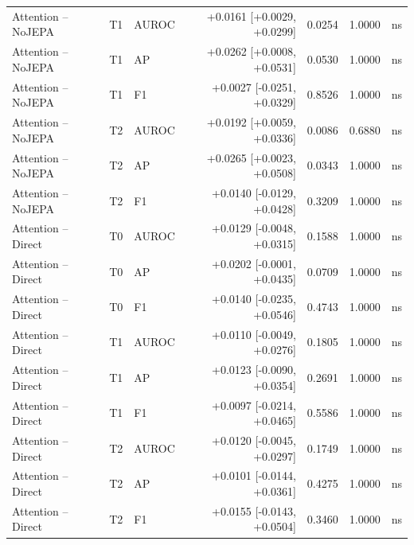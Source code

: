 \begin{table}[t]
\begin{tabular}{lllrrrc}
Attention -- NoJEPA & T1 & AUROC & +0.0161 [+0.0029, +0.0299] & 0.0254 & 1.0000 & ns \\
Attention -- NoJEPA & T1 & AP & +0.0262 [+0.0008, +0.0531] & 0.0530 & 1.0000 & ns \\
Attention -- NoJEPA & T1 & F1 & +0.0027 [-0.0251, +0.0329] & 0.8526 & 1.0000 & ns \\
Attention -- NoJEPA & T2 & AUROC & +0.0192 [+0.0059, +0.0336] & 0.0086 & 0.6880 & ns \\
Attention -- NoJEPA & T2 & AP & +0.0265 [+0.0023, +0.0508] & 0.0343 & 1.0000 & ns \\
Attention -- NoJEPA & T2 & F1 & +0.0140 [-0.0129, +0.0428] & 0.3209 & 1.0000 & ns \\
Attention -- Direct & T0 & AUROC & +0.0129 [-0.0048, +0.0315] & 0.1588 & 1.0000 & ns \\
Attention -- Direct & T0 & AP & +0.0202 [-0.0001, +0.0435] & 0.0709 & 1.0000 & ns \\
Attention -- Direct & T0 & F1 & +0.0140 [-0.0235, +0.0546] & 0.4743 & 1.0000 & ns \\
Attention -- Direct & T1 & AUROC & +0.0110 [-0.0049, +0.0276] & 0.1805 & 1.0000 & ns \\
Attention -- Direct & T1 & AP & +0.0123 [-0.0090, +0.0354] & 0.2691 & 1.0000 & ns \\
Attention -- Direct & T1 & F1 & +0.0097 [-0.0214, +0.0465] & 0.5586 & 1.0000 & ns \\
Attention -- Direct & T2 & AUROC & +0.0120 [-0.0045, +0.0297] & 0.1749 & 1.0000 & ns \\
Attention -- Direct & T2 & AP & +0.0101 [-0.0144, +0.0361] & 0.4275 & 1.0000 & ns \\
Attention -- Direct & T2 & F1 & +0.0155 [-0.0143, +0.0504] & 0.3460 & 1.0000 & ns \\
\bottomrule
\end{tabular}
\end{table}
